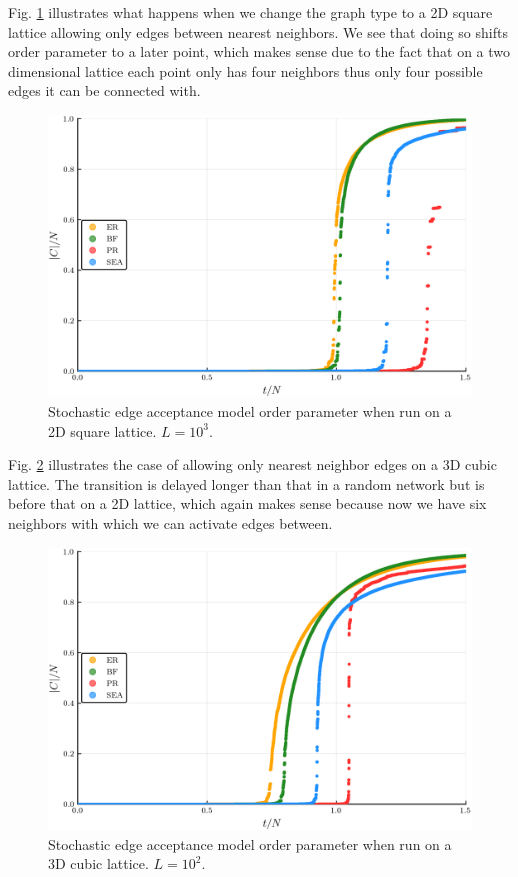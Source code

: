 Fig. \ref{fig:Lattice2D_ER_BF_PR_SEA_transition} illustrates what happens when we change the graph type to a 2D square lattice allowing only edges between nearest neighbors.
We see that doing so shifts order parameter to a later point, which makes sense due to the fact that on a two dimensional lattice each point only has four neighbors thus only four possible edges it can be connected with.

\begin{figure}[H]
	\centering
	\includegraphics[width=350pt, clip]{images/Lattice2D_ER_BF_PR_SEA_1e6_order_param.png}
	\caption{Stochastic edge acceptance model order parameter when run on a 2D square lattice. $L = 10^3$.}
	\label{fig:Lattice2D_ER_BF_PR_SEA_transition}
\end{figure}

Fig. \ref{fig:Lattice3D_ER_BF_PR_SEA_transition} illustrates the case of allowing only nearest neighbor edges on a 3D cubic lattice. The transition is delayed longer than that in a random network but is before that on a 2D lattice, which again makes sense because now we have six neighbors with which we can activate edges between.

\begin{figure}[H]
	\centering
	\includegraphics[width=350pt, clip]{images/Lattice3D_ER_BF_PR_SEA_1e6_order_param.png}
	\caption{Stochastic edge acceptance model order parameter when run on a 3D cubic lattice. $L = 10^2.$}
	\label{fig:Lattice3D_ER_BF_PR_SEA_transition}
\end{figure}

